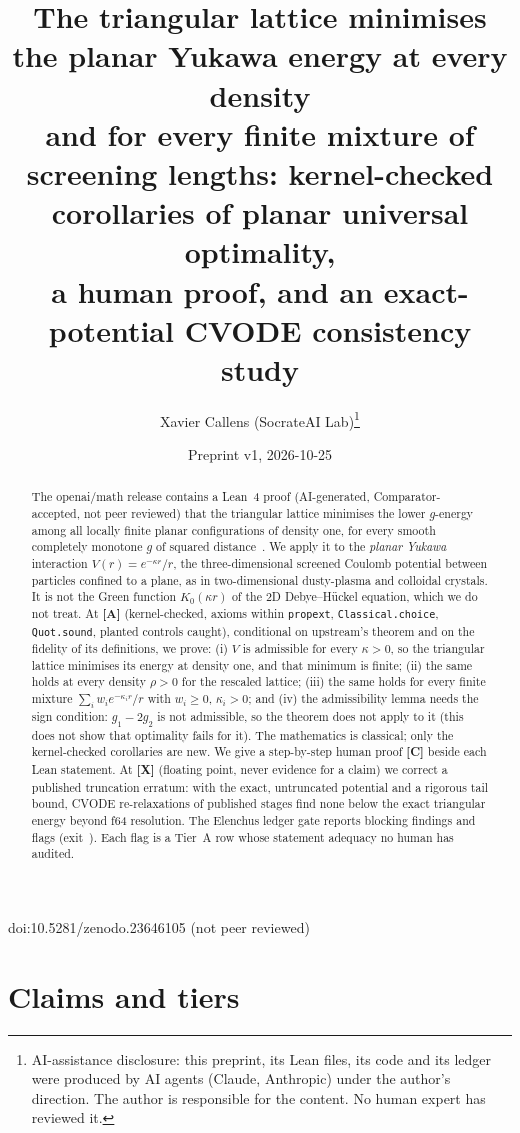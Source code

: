 \documentclass[11pt]{article}
\title{The triangular lattice minimises the planar Yukawa energy at every density\\ and for every finite mixture of screening lengths:
kernel-checked corollaries of planar universal optimality,\\ a human proof, and an exact-potential CVODE consistency study}
\author{Xavier Callens (SocrateAI Lab)\thanks{AI-assistance disclosure: this preprint, its Lean files, its code and
its ledger were produced by AI agents (Claude, Anthropic) under the author's direction. The author is responsible for
the content. No human expert has reviewed it.}}
\date{Preprint v1, 2026-10-25}
\theoremstyle{remark}
\newcommand{\tier}[1]{\textbf{[#1]}}
\begin{document}
\maketitle
\begin{center}\small doi:10.5281/zenodo.23646105 \quad (not peer reviewed)\end{center}


\begin{abstract}
The openai/math release contains a Lean~4 proof (AI-generated, Comparator-accepted, not peer reviewed) that the
triangular lattice minimises the lower $g$-energy among all locally finite planar configurations of density one, for
every smooth completely monotone $g$ of squared distance~\cite{oai}. We apply it to the \emph{planar Yukawa}
interaction $V(r)=e^{-\kappa r}/r$, the three-dimensional screened Coulomb potential between particles confined to a
plane, as in two-dimensional dusty-plasma and colloidal crystals. It is not the Green function $K_0(\kappa r)$ of the
2D Debye--H\"uckel equation, which we do not treat. At \tier{A} (kernel-checked, axioms within
\texttt{propext}, \texttt{Classical.choice}, \texttt{Quot.sound}, planted controls caught), conditional on upstream's
theorem and on the fidelity of its definitions, we prove:
(i) $V$ is admissible for every $\kappa>0$, so the triangular lattice minimises its energy at density one, and that
minimum is finite;
(ii) the same holds at every density $\rho>0$ for the rescaled lattice;
(iii) the same holds for every finite mixture $\sum_i w_i e^{-\kappa_i r}/r$ with $w_i\ge 0$, $\kappa_i>0$; and
(iv) the admissibility lemma needs the sign condition: $g_1-2g_2$ is not admissible, so the theorem does not apply
to it (this does not show that optimality fails for it).
The mathematics is classical; only the kernel-checked corollaries are new. We give a step-by-step human proof
\tier{C} beside each Lean statement. At \tier{X} (floating point, never evidence for a claim) we correct a published
truncation erratum: with the exact, untruncated potential and a rigorous tail bound, CVODE re-relaxations of
\NRelax{} published stages find none below the exact triangular energy beyond f64 resolution. The Elenchus ledger gate reports
\LedgerBlocks{} blocking findings and \LedgerFlags{} flags (exit~\LedgerExit). Each flag is a Tier~A row whose
statement adequacy no human has audited.
\end{abstract}

\section{Claims and tiers}\label{sec:claims}
\end{document}
